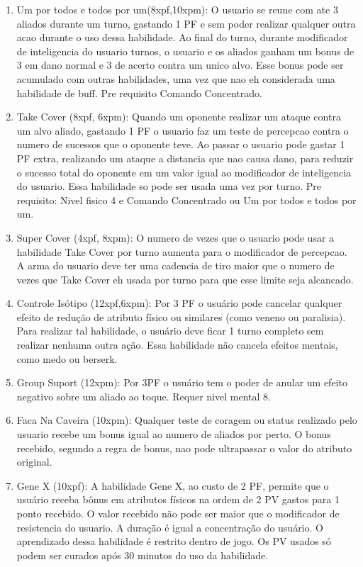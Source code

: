 \begin{enumerate}
 	\item Um por todos e todos por um(8xpf,10xpm): O usuario se reune com ate 3 aliados durante um turno, gastando 1 PF e sem poder realizar qualquer outra acao durante o uso dessa habilidade. Ao final do turno, durante modificador de inteligencia do usuario turnos, o usuario e os aliados ganham um bonus de 3 em dano normal e 3 de acerto contra um unico alvo.  Esse bonus pode ser acumulado com outras habilidades, uma vez que nao eh considerada uma habilidade de buff. Pre requisito Comando Concentrado.
 	
 	\item Take Cover (8xpf, 6xpm): Quando um oponente realizar um ataque contra um alvo aliado, gastando 1 PF o usuario faz um teste de percepcao contra o numero de sucessos que o oponente teve. Ao passar o usuario pode gastar 1 PF extra, realizando um ataque a distancia que nao causa dano, para reduzir o sucesso total do oponente em um valor igual ao modificador de inteligencia do usuario. Essa habilidade so pode ser usada uma vez por turno. Pre requisito: Nivel fisico 4 e Comando Concentrado ou Um por todos e todos por um.
 	
 	\item Super Cover (4xpf, 8xpm): O numero de vezes que o usuario pode usar a habilidade Take Cover por turno aumenta para o modificador de percepcao. A arma do usuario deve ter uma cadencia de tiro maior que o numero de vezes que Take Cover eh usada por turno para que esse limite seja alcancado.

	\item Controle Isótipo (12xpf,6xpm): Por 3 PF o usuário pode cancelar qualquer efeito de redução de atributo físico ou similares (como veneno ou paralisia). Para realizar tal habilidade, o usuário deve ficar 1 turno completo sem realizar nenhuma outra ação. Essa habilidade não cancela efeitos mentais, como medo ou berserk.
	
	\item Group Suport (12xpm): Por 3PF o usuário tem o poder de anular um efeito negativo sobre um aliado ao toque. Requer nivel mental 8.

    \item Faca Na Caveira (10xpm): Qualquer teste de coragem ou status realizado pelo usuario recebe um bonus igual ao numero de aliados por perto. O bonus recebido, segundo a regra de bonus, nao pode ultrapassar o valor do atributo original.
	
	\item Gene X (10xpf): A habilidade Gene X, ao custo de 2 PF, permite que o usuário receba bônus em atributos físicos na ordem de 2 PV gastos para 1 ponto recebido. O valor recebido não pode ser maior que o modificador de resistencia do usuario. A duração é igual a concentração do usuário. O aprendizado dessa habilidade é restrito dentro de jogo. Os PV usados só podem ser curados após 30 minutos do uso da habilidade.
	

\end{enumerate}
